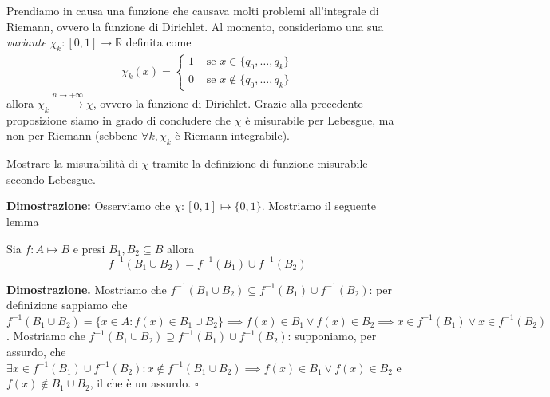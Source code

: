 %
Prendiamo in causa una funzione che causava molti problemi all'integrale di Riemann, ovvero la funzione di Dirichlet. Al momento, consideriamo una sua \emph{variante} $\chi_k: [0, 1] \to \mathbb{R}$ definita come
%
\[\begin{aligned}
	\chi_k(x) = \begin{cases}
		1 & \text{ se } x \in \{q_0, \ldots, q_k \} \\
		0 & \text{ se } x \not\in \{q_0, \ldots, q_k \}
	\end{cases}
\end{aligned}\]
allora $\chi_k \stackrel{n \to +\infty}{\to} \chi$, ovvero la funzione di Dirichlet. Grazie alla precedente proposizione siamo in grado di concludere che $\chi$ è misurabile per Lebesgue, ma non per Riemann (sebbene $\forall k, \chi_k$ è Riemann-integrabile).
%
\vspace{0.5cm}
\begin{exercise}
Mostrare la misurabilità di $\chi$ tramite la definizione di funzione misurabile secondo Lebesgue.
\end{exercise}
%
\textbf{Dimostrazione: }
	Osserviamo che $\chi: [0, 1] \mapsto \{0, 1\}$. Mostriamo il seguente lemma
	\begin{lemma}
		Sia $f: A \mapsto B$ e presi $B_1, B_2 \subseteq B$ allora
		$$
			f^{-1}(B_1 \cup B_2) = f^{-1}(B_1) \cup f^{-1}(B_2)
		$$
	\end{lemma}
	\noindent \textbf{Dimostrazione. }
		Mostriamo che $f^{-1}(B_1 \cup B_2) \subseteq f^{-1}(B_1) \cup f^{-1}(B_2)$: per definizione sappiamo che $f^{-1}(B_1 \cup B_2) = \{x \in A: f(x) \in B_1 \cup B_2 \} \implies f(x) \in B_1 \vee f(x) \in B_2 \implies x \in f^{-1}(B_1) \vee x \in f^{-1}(B_2)$.
		Mostriamo che $f^{-1}(B_1 \cup B_2) \supseteq f^{-1}(B_1) \cup f^{-1}(B_2)$: supponiamo, per assurdo, che $\exists x \in f^{-1}(B_1) \cup f^{-1}(B_2) : x \not\in f^{-1}(B_1 \cup B_2) \implies f(x) \in B_1 \vee f(x) \in B_2$ e $f(x) \not\in B_1 \cup B_2$, il che è un assurdo.
	\hfill $\square$
	

